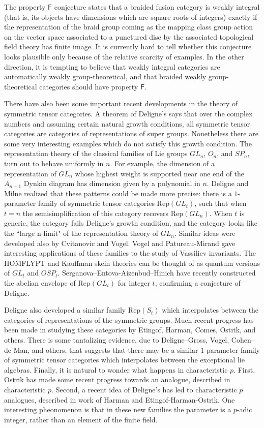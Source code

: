 \documentclass[12pt]{article}
\begin{document}
The property $\mathsf F$ conjecture states that a braided fusion category is weakly integral (that is, its objects have dimensions which are square roots of integers) exactly if the representation of the braid group coming as the mapping class group action on the vector space associated to a punctured disc by the associated topological field theory has finite image. It is currently hard to tell whether this conjecture looks plausible only because of the relative scarcity of examples. In the other direction, it is tempting to believe that weakly integral categories are automatically weakly group-theoretical, and that braided weakly group-theoretical categories should have property $\mathsf F$.

There have also been some important recent developments in the theory of symmetric tensor categories. A theorem of Deligne's says that over the complex numbers and assuming certain natural growth conditions, all symmetric tensor categories are categories of representations of super groups. Nonetheless there are some very interesting examples which do not satisfy this growth condition. The representation theory of the classical families of Lie groups $GL_n$, $O_n$, and $SP_n$, turn out to behave uniformly in $n$. For example, the dimension of a representation of $GL_n$ whose highest weight is supported near one end of the $A_{n-1}$ Dynkin diagram has dimension given by a polynomial in $n$. Deligne and Milne realized that these patterns could be made more precise: there is a $1$-parameter family of symmetric tensor categories $\mathrm{Rep}(GL_t)$, such that when $t=n$ the semisimplification of this category recovers $\mathrm{Rep}(GL_n)$. When $t$ is generic, the category fails Deligne's growth condition, and the category looks like the ``large n limit" of the representation theory of $GL_n$.  Similar ideas were developed also by Cvitanovic and Vogel. Vogel and Patureau-Mirand gave interesting applications of these families to the study of Vassiliev invariants.  The HOMFLYPT and Kauffman skein theories can be thought of as quantum versions of $GL_t$ and $OSP_t$. Serganova--Entova-Aizenbud--Hinich have recently constructed the abelian envelope of $\mathrm{Rep}(GL_t)$ for integer $t$, confirming a conjecture of Deligne.

Deligne also developed a similar family $\mathrm{Rep}(S_t)$ which interpolates between the categories of representations of the symmetric groups. Much recent progress has been made in studying these categories by Etingof, Harman, Comes, Ostrik, and others. There is some tantalizing evidence, due to Deligne--Gross, Vogel, Cohen--de Man, and others, that suggests that there may be a similar $1$-parameter family of symmetric tensor categories which interpolates between the exceptional lie algebras. Finally, it is natural to wonder what happens in characteristic $p$. First, Ostrik has made some recent progress towards an analogue, described in characteristic $p$.  Second, a recent idea of Deligne's has led to characteristic $p$ analogues, described in work of Harman and Etingof-Harman-Ostrik. One interesting pheonomenon is that in these new families the parameter is a $p$-adic integer, rather than an element of the finite field.
\end{document}
